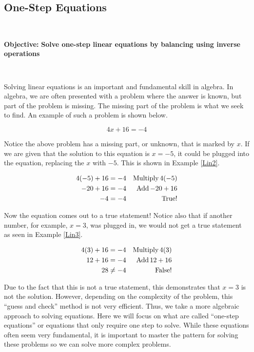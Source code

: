 \subsection{One-Step Equations}\par
~\par
{\textbf{Objective:}} {\textbf{Solve one-step linear equations by
balancing using inverse operations}}\par
~\par
Solving linear equations is an important and fundamental skill in algebra. In
algebra, we are often presented with a problem where the answer is known, but
part of the problem is missing. The missing part of the problem is what we
seek to find. An example of such a problem is shown below.

\begin{example}\label{Lin1}
\[ 4 x + 16 = - 4 \]
\end{example}
Notice the above problem has a missing part, or unknown, that is marked by
$x$. If we are given that the solution to this equation is $x=- 5$, it could be
plugged into the equation, replacing the $x$ with $- 5$. This is shown in
Example \ref{Lin2}.

\begin{example}\label{Lin2}
\begin{eqnarray*}
  4 (- 5) + 16 = - 4 &  & \operatorname{Multiply} 4 (- 5)\\
  - 20 + 16 = - 4 &  & \operatorname{Add} - 20 + 16\\
  - 4 = - 4 &  & \operatorname{True} !
\end{eqnarray*}
\end{example}

Now the equation comes out to a true statement! Notice also that if another
number, for example, $x=3$, was plugged in, we would not get a true statement as
seen in Example \ref{Lin3}.

\begin{example}\label{Lin3}
 \begin{eqnarray*}
  4 (3) + 16 = - 4 &  & \operatorname{Multiply} 4 (3)\\
  12 + 16 = - 4 &  & \operatorname{Add} 12 + 16\\
  28 \neq - 4 &  & \operatorname{False} !
\end{eqnarray*}
\end{example}
Due to the fact that this is not a true statement, this demonstrates that $x=3$
is not the solution. However, depending on the complexity of the problem, this
``guess and check'' method is not very efficient. Thus, we take a more
algebraic approach to solving equations. Here we will focus on what are called
``one-step equations'' or equations that only require one step to solve. While
these equations often seem very fundamental, it is important to master the
pattern for solving these problems so we can solve more complex problems.\par
~\par

